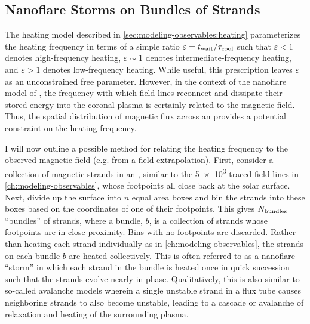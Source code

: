 \subsection{Nanoflare Storms on Bundles of Strands}\label{sec:bundle}

The heating model described in \autoref{sec:modeling-observables:heating} parameterizes the heating frequency in terms of a simple ratio $\varepsilon=t_{\textup{wait}}/\tau_\textup{cool}$ such that $\varepsilon<1$ denotes high-frequency heating, $\varepsilon\sim1$ denotes intermediate-frequency heating, and $\varepsilon>1$ denotes low-frequency heating. While useful, this prescription leaves $\varepsilon$ as an unconstrained free parameter. However, in the context of the nanoflare model of \citet[see \autoref{sec:nanoflares}]{parker_nanoflares_1988}, the frequency with which field lines reconnect and dissipate their stored energy into the coronal plasma is certainly related to the magnetic field. Thus, the spatial distribution of magnetic flux across an \AR{} provides a potential constraint on the heating frequency.

I will now outline a possible method for relating the heating frequency to the observed magnetic field (e.g. from a field extrapolation). First, consider a collection of magnetic strands in an \AR{}, similar to the \num{5e3} traced field lines in \autoref{ch:modeling-observables}, whose footpoints all close back at the solar surface. Next, divide up the surface into $n$ equal area boxes and bin the strands into these boxes based on the coordinates of one of their footpoints. This gives $N_\textup{bundles}$ ``bundles'' of strands, where a bundle, $b$, is a collection of strands whose footpoints are in close proximity. Bins with no footpoints are discarded. Rather than heating each strand individually as in \autoref{ch:modeling-observables}, the strands on each bundle $b$ are heated collectively. This is often referred to as a nanoflare ``storm'' in which each strand in the bundle is heated once in quick succession \citep{klimchuk_key_2015,schmelz_what_2015,mulu-moore_can_2011} such that the strands evolve nearly in-phase. Qualitatively, this is also similar to so-called avalanche models \citep[e.g.][]{hood_mhd_2016} wherein a single unstable strand in a flux tube causes neighboring strands to also become unstable, leading to a cascade or avalanche of relaxation and heating of the surrounding plasma.

